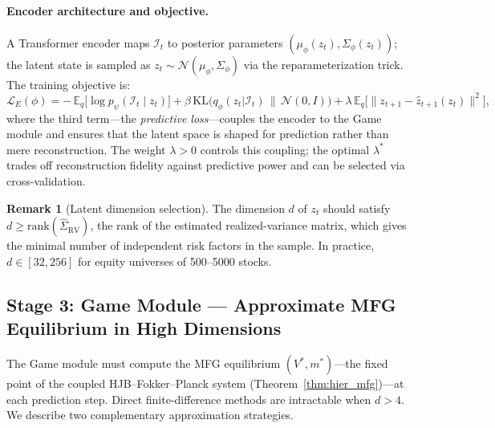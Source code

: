 \documentclass[12pt,a4paper]{article}
\theoremstyle{plain}
\theoremstyle{definition}
\newtheorem{remark}[theorem]{Remark}
\newcommand{\1}{\mathbbm{1}}
\begin{document}
\paragraph{Encoder architecture and objective.}
A Transformer encoder \citep{VaswaniAttention2017} maps $\mathcal{I}_t$ to
posterior parameters $(\mu_\phi(z_t), \Sigma_\phi(z_t))$; the latent state is
sampled as $z_t \sim \mathcal{N}(\mu_\phi, \Sigma_\phi)$ via the
reparameterization trick.  The training objective is:
\begin{equation}
\label{eq:encoder_loss}
\mathcal{L}_E(\phi) = -\,\mathbb{E}_q\bigl[\log p_\psi(\mathcal{I}_t \mid z_t)\bigr]
  + \beta\,\mathrm{KL}\bigl(q_\phi(z_t|\mathcal{I}_t)\,\|\,\mathcal{N}(0,I)\bigr)
  + \lambda\,\mathbb{E}_q\bigl[\|z_{t+1} - \hat{z}_{t+1}(z_t)\|^2\bigr],
\end{equation}
where the third term—the \emph{predictive loss}—couples the encoder to the Game
module and ensures that the latent space is shaped for prediction rather than
mere reconstruction.  The weight $\lambda > 0$ controls this coupling;
the optimal $\lambda^*$ trades off reconstruction fidelity against predictive
power and can be selected via cross-validation.

\begin{remark}[Latent dimension selection]
The dimension $d$ of $z_t$ should satisfy $d \geq \mathrm{rank}(\hat\Sigma_\mathrm{RV})$,
the rank of the estimated realized-variance matrix, which gives the minimal
number of independent risk factors in the sample.  In practice, $d \in [32, 256]$
for equity universes of 500–5000 stocks.
\end{remark}

\subsection{Stage 3: Game Module — Approximate MFG Equilibrium in High Dimensions}
\label{subsec:game_impl}

The Game module must compute the MFG equilibrium $(V^*, m^*)$—the fixed point
of the coupled HJB–Fokker–Planck system (Theorem~\ref{thm:hier_mfg})—at each
prediction step.  Direct finite-difference methods are intractable when $d > 4$.
We describe two complementary approximation strategies.
\end{document}
